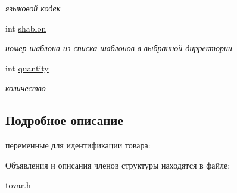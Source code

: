 \begin{DoxyCompactItemize}
\begin{DoxyCompactList}\small\item\em языковой кодек \end{DoxyCompactList}\item 
\hypertarget{struct_tovar_a2b61d47e68345a4ceb2ff00e6c03bc5a}{int \hyperlink{struct_tovar_a2b61d47e68345a4ceb2ff00e6c03bc5a}{shablon}}\label{struct_tovar_a2b61d47e68345a4ceb2ff00e6c03bc5a}

\begin{DoxyCompactList}\small\item\em номер шаблона из списка шаблонов в выбранной дирректории \end{DoxyCompactList}\item 
\hypertarget{struct_tovar_aed46d41d507daa3662368e50c87e046c}{int \hyperlink{struct_tovar_aed46d41d507daa3662368e50c87e046c}{quantity}}\label{struct_tovar_aed46d41d507daa3662368e50c87e046c}

\begin{DoxyCompactList}\small\item\em количество \end{DoxyCompactList}\end{DoxyCompactItemize}


\subsection{Подробное описание}
переменные для идентификации товара\-: 

Объявления и описания членов структуры находятся в файле\-:\begin{DoxyCompactItemize}
\item 
tovar.\-h\end{DoxyCompactItemize}
